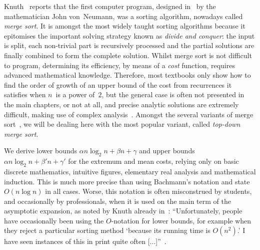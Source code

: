 Knuth~\cite{Knuth:1996} reports that the first computer program,
designed in~ by the mathematician John von~Neumann,
was a sorting algorithm, nowadays called \emph{merge sort}. It is
amongst the most widely taught sorting algorithms because it
epitomises the important solving strategy known as \emph{divide and
conquer}: the input is split, each non\hyp{}trivial part is
recursively processed and the partial solutions are finally combined
to form the complete solution. Whilst merge sort is not difficult to
program, determining its efficiency, by means of a \emph{cost}
function, requires advanced mathematical knowledge. Therefore, most
textbooks \cite{GrahamKnuthPatashnik:1994,CLRS:2009} only show how to
find the order of growth of an upper bound of the cost from
recurrences it satisfies when \(n\)~is a power of~\(2\), but the
general case is often not presented in the main chapters, or not at
all, and precise analytic solutions are extremely difficult, making
use of complex analysis~\cite{FlajoletGolin:1994, Hwang:1998,
ChenHwangChen:1999}. Amongst the several variants of merge
sort~\cite{Knuth:1998, GolinSedgewick:1993}, we will be dealing here
with the most popular variant, called \emph{top-down merge sort}.

We derive lower bounds $\alpha n\log_2 n + \beta n + \gamma$ and upper
bounds $\alpha n\log_2 n + \beta' n + \gamma'$ for the extremum and
mean costs, relying only on basic discrete mathematics, intuitive
figures, elementary real analysis and mathematical induction. This is
much more precise than using Bachmann's notation and state \(O(n\log
n)\) in all cases. Worse, this notation is often misconstrued by
students, and occasionally by professionals, when it is used on the
main term of the asymptotic expansion, as noted by Knuth already
in~: ``Unfortunately, people have occasionally been
using the \(O\)-notation for lower bounds, for example when they
reject a particular sorting method `because its running time is
\(O(n^2)\).' I have seen instances of this in print quite often
[...]''~\cite{Knuth:2000a}.
